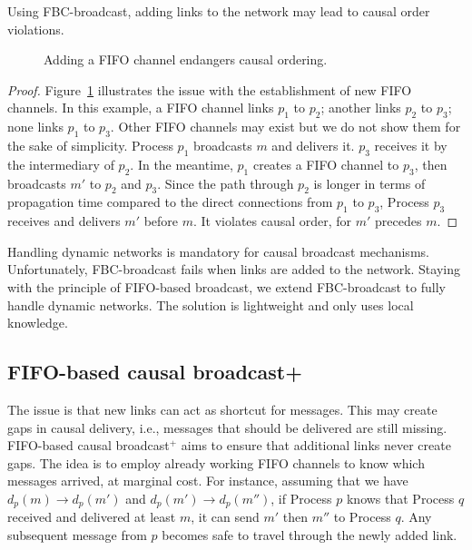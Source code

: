 \begin{theorem}
  Using FBC-broadcast, adding links to the network may lead to causal order
  violations.
\end{theorem}

\begin{figure}
  \begin{center}
    
    \caption{\label{fig:problem}Adding a FIFO channel endangers causal
      ordering.}
  \end{center}
\end{figure}

\begin{proof}
  Figure~\ref{fig:problem} illustrates the issue with the establishment of new
  FIFO channels. In this example, a FIFO channel links $p_1$ to $p_2$; another
  links $p_2$ to $p_3$; none links $p_1$ to $p_3$. Other FIFO channels may exist
  but we do not show them for the sake of simplicity. Process $p_1$ broadcasts
  $m$ and delivers it. $p_3$ receives it by the intermediary of $p_2$. In the
  meantime, $p_1$ creates a FIFO channel to $p_3$, then broadcasts $m'$ to $p_2$
  and $p_3$. Since the path through $p_2$ is longer in terms of propagation time
  compared to the direct connections from $p_1$ to $p_3$, Process $p_3$ receives
  and delivers $m'$ before $m$. It violates causal order, for $m'$ precedes $m$.
\end{proof}

Handling dynamic networks is mandatory for causal broadcast
mechanisms. Unfortunately, FBC-broadcast fails when links are added to the
network. Staying with the principle of FIFO-based broadcast, we extend
FBC-broadcast to fully handle dynamic networks. The solution is lightweight and
only uses local knowledge.

\subsection{FIFO-based causal broadcast+}
\label{subsec:bufferbroadcast}

The issue is that new links can act as shortcut for messages. This may create
gaps in causal delivery, i.e., messages that should be delivered are still
missing.  FIFO-based causal broadcast$^+$ aims to ensure that additional links
never create gaps. The idea is to employ already working FIFO channels to know
which messages arrived, at marginal cost. For instance, assuming that we have
$d_p(m) \rightarrow d_p(m')$ and $d_p(m') \rightarrow d_p(m'')$, if Process $p$
knows that Process $q$ received and delivered at least $m$, it can send $m'$
then $m''$ to Process $q$. Any subsequent message from $p$ becomes safe to
travel through the newly added link.

